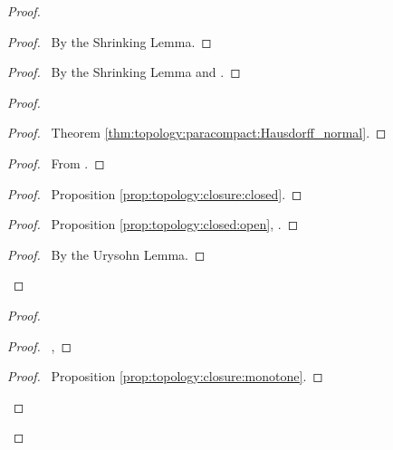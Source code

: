 \begin{proof}
  \pf
  \begin{proof}
    \pf\ By the Shrinking Lemma.
  \end{proof}
  \begin{proof}
    \pf\ By the Shrinking Lemma and .
  \end{proof}
  \begin{proof}
    \begin{proof}
      \pf\ Theorem \ref{thm:topology:paracompact:Hausdorff_normal}.
    \end{proof}
    \begin{proof}
      \pf\ From .
    \end{proof}
    \begin{proof}
      \pf\ Proposition \ref{prop:topology:closure:closed}.
    \end{proof}
    \begin{proof}
      \pf\ Proposition \ref{prop:topology:closed:open}, .
    \end{proof}
    \qedstep
    \begin{proof}
      \pf\ By the Urysohn Lemma.
    \end{proof}
  \end{proof}
  \begin{proof}
    \begin{proof}
      \pf\ , 
    \end{proof}
    \qedstep
    \begin{proof}
      \pf\ Proposition \ref{prop:topology:closure:monotone}.

\end{proof}
\end{proof}
\end{proof}
